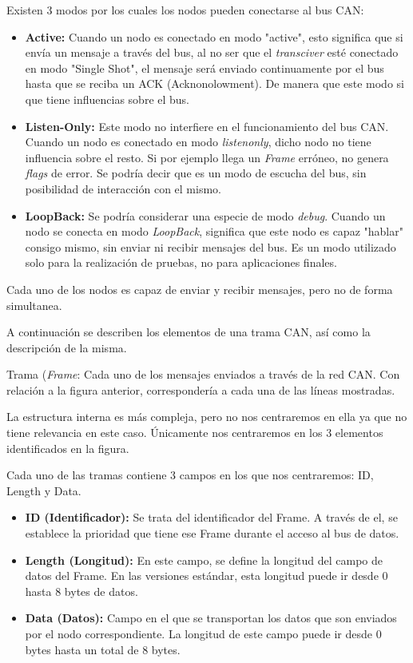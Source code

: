 Existen 3 modos por los cuales los nodos pueden conectarse al bus CAN:

\begin{itemize}
\item
\textbf{Active:} Cuando un nodo es conectado en modo "active", esto significa que si envía un mensaje a través del bus, al no ser que el \emph{transciver} esté conectado en modo "Single Shot", el mensaje será enviado continuamente por el bus hasta que se reciba un ACK (Acknonolowment). De manera que este modo si que tiene influencias sobre el bus.

\item
\textbf{Listen-Only:} Este modo no interfiere en el funcionamiento del bus CAN. Cuando un nodo es conectado en modo \emph{listenonly}, dicho nodo no tiene influencia sobre el resto. Si por ejemplo llega un \emph{Frame} erróneo, no genera \emph{flags} de error. Se podría decir que es un modo de escucha del bus, sin posibilidad de interacción con el mismo.

\item
\textbf{LoopBack:} Se podría considerar una especie de modo \emph{debug}. Cuando un nodo se conecta en modo \emph{LoopBack}, significa que este nodo es capaz "hablar" consigo mismo, sin enviar ni recibir mensajes del bus. Es un modo utilizado solo para la realización de pruebas, no para aplicaciones finales.

\end{itemize}

Cada uno de los nodos es capaz de enviar y recibir mensajes, pero no de forma simultanea.


A continuación se describen los elementos de una trama CAN, así como la descripción de la misma.

Trama (\emph{Frame}: Cada uno de los mensajes enviados a través de la red CAN. Con relación a la figura anterior, correspondería a cada una de las líneas mostradas.

La estructura interna es más compleja, pero no nos centraremos en ella ya que no tiene relevancia en este caso. Únicamente nos centraremos en los 3 elementos identificados en la figura.

Cada uno de las tramas contiene 3 campos en los que nos centraremos: ID, Length y Data.

\begin{itemize}
\item
\textbf{ID (Identificador):} Se trata del identificador del Frame. A través de el, se establece la prioridad que tiene ese Frame durante el acceso al bus de datos.
\item
\textbf{Length (Longitud):} En este campo, se define la longitud del campo de datos del Frame. En las versiones estándar, esta longitud puede ir desde 0 hasta 8 bytes de datos.
\item
\textbf{Data (Datos):} Campo en el que se transportan los datos que son enviados por el nodo correspondiente. La longitud de este campo puede ir desde 0 bytes hasta un total de 8 bytes.
\end{itemize}

